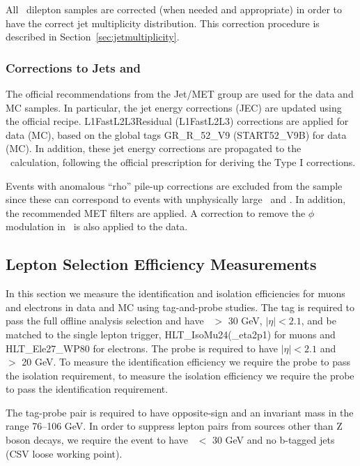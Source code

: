 All \ttbar\ dilepton samples are corrected (when needed and
appropriate) 
in order to have the correct jet multiplicity distribution.  This
correction procedure is described in Section~\ref{sec:jetmultiplicity}.


\subsubsection{Corrections to Jets and \met}
\label{sec:JetMet}

The official recommendations from the Jet/MET group are used for 
the data and MC samples. In particular, the jet
energy corrections (JEC) are updated using the official recipe.
L1FastL2L3Residual (L1FastL2L3) corrections are applied for data (MC),
based on the global tags GR\_R\_52\_V9 (START52\_V9B) for
data (MC). In addition, these jet energy corrections are propagated to
the \met\ calculation, following the official prescription for
deriving the Type I corrections. 

Events with anomalous ``rho'' pile-up corrections are excluded from the sample since these 
can correspond to events with unphysically large \met\ and \mt.
In addition, the recommended MET filters are applied. 
A correction to remove the $\phi$ modulation in \met\ is also applied
to the data.


\subsection{Lepton Selection Efficiency Measurements}
\label{sec:lepEff}

In this section we measure the identification and isolation efficiencies for muons and electrons in data and MC using tag-and-probe studies. 
The tag is required to pass the full offline analysis selection and have \pt\ $>$ 30 GeV, $|\eta|<2.1$, and be matched to the single
lepton trigger, HLT\_IsoMu24(\_eta2p1) for muons and HLT\_Ele27\_WP80 for electrons. 
The probe is required to have $|\eta|<2.1$ and \pt\ $>$ 20 GeV. To measure the identification efficiency we require the probe to pass the isolation requirement,
to measure the isolation efficiency we require the probe to pass the
identification requirement.

The tag-probe pair is required to have opposite-sign and an invariant mass in the range 76--106 GeV.
In order to suppress lepton pairs from sources other than Z boson
decays, we require the event to have \met\ $<$ 30 GeV and no b-tagged
jets (CSV loose working point).

